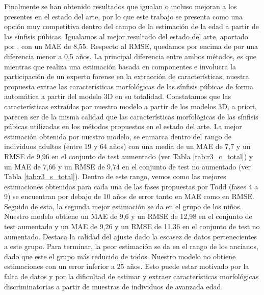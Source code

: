 Finalmente se han obtenido resultados que igualan o incluso mejoran a los presentes en el estado del arte, por lo que este trabajo se presenta como una opción muy competitiva dentro del campo de la estimación de la edad a partir de las sínfisis púbicas. Igualamos al mejor resultado del estado del arte, aportado por \cite{villegas_TFG}, con un MAE de 8,55. Respecto al RMSE, quedamos por encima de \cite{villegas_TFG} por una diferencia menor a 0,5 años. La principal diferencia entre ambos métodos, es que mientras que \cite{villegas_TFG} realiza una estimación basada en componentes e involucra la participación de un experto forense en la extracción de características, nuestra propuesta extrae las características morfológicas de las sínfisis púbicas de forma automática a partir del modelo 3D en su totalidad.
Constatamos que las características extraídas por nuestro modelo a partir de los modelos 3D, a priori, parecen ser de la misma calidad que las características morfológicas de las sínfisis púbicas utilizadas en los métodos propuestos en el estado del arte. La mejor estimación obtenida por nuestro modelo, se enmarca dentro del rango de individuos adultos (entre 19 y 64 años) con una media de un MAE de 7,7 y un RMSE de 9,96 en el conjunto de test aumentado (ver Tabla \ref{tab:r3_c_total}) y un MAE de 7,66 y un RMSE de 9,74 en el conjunto de test no aumentado (ver Tabla \ref{tab:r3_s_total}). Dentro de este rango, vemos como las mejores estimaciones obtenidas para cada una de las fases propuestas por Todd (fases 4 a 9) se encuentran por debajo de 10 años de error tanto en MAE como en RMSE. Seguido de esta, la segunda mejor estimación se da en el grupo de los niños. Nuestro modelo obtiene un MAE de 9,6 y un RMSE de 12,98 en el conjunto de test aumentado y un MAE de 9,26 y un RMSE de 11,36 en el conjunto de test no aumentado. Destaca la calidad del ajuste dado la escasez de datos pertenecientes a este grupo. Para terminar, la peor estimación se da en el rango de los ancianos, dado que este el grupo más reducido de todos. Nuestro modelo no obtiene estimaciones con un error inferior a 25 años. Esto puede estar motivado por la falta de datos y por la dificultad de estimar y extraer características morfológicas discriminatorias a partir de muestras de individuos de avanzada edad.
\\


